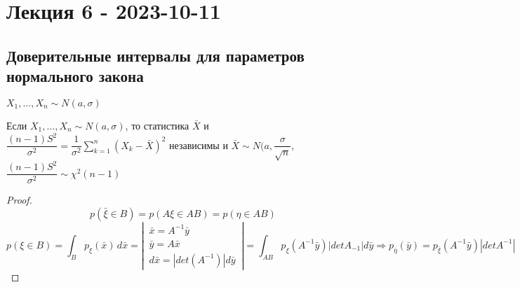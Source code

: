 \chapter{Лекция 6 - 2023-10-11}

\section{Доверительные интервалы для параметров нормального закона}

$X_1, \dots, X_n \sim N(a, \sigma)$

\begin{theorem}
  Если $X_1, \dots, X_n \sim N(a, \sigma)$, то статистика $\bar X$ и $\dfrac{(n-1) S^2}{\sigma^2} = \dfrac{1}{\sigma^2} \sum\limits_{k=1}^n (X_k-\bar X)^2$ независимы и $\bar X \sim N(a, \dfrac{\sigma}{\sqrt{n}}$, $\dfrac{(n-1) S^2}{\sigma^2} \sim \chi^2(n-1)$
\end{theorem}

\begin{proof}
  $$p(\bar\xi \in B) = p(A\xi \in AB) = p(\eta \in AB)$$
  $$p(\xi \in B) = \int_B p_\xi (\bar x) \, d\bar x = \left|\, \begin{aligned} \bar x = A^{-1} \bar y \\ \bar y = A \bar x \\ d\bar x = |det(A^{-1})| d\bar y \end{aligned} \,\right| = \int_{AB} p_\xi(A^{-1} \bar y) |det A_{-1}| d\bar y \Rightarrow p_{\bar \eta} (\bar y) = p_\bar \xi(A^{-1} \bar y) |det A^{-1}|$$
\end{proof}



